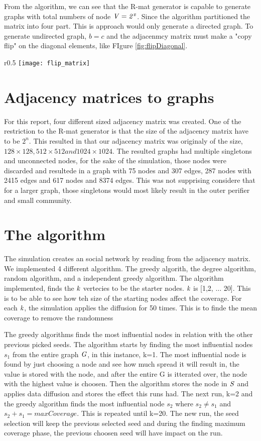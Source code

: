 From the algorithm, we can see that the R-mat generator is capable to generate graphs with total numbers of node $ \it{V} = 2^x$. Since the algorithm partitioned the matrix into four part. This is approach would only generate a directed graph. To generate undirected graph, $b = c$ and the adjacenmcy matrix must make a "copy flip" on the diagonal elements, like FIgure \ref{fig:flipDiagonal}. 

\begin{wrapfigure}{r}{0.5\textwidth}
\texttt{[image: flip\_matrix]}
\caption{How the adacency matrix is fliped on the diagonal}
\label{fig:flipDiagonal}
\end{wrapfigure}


\section{Adjacency matrices to graphs}
For this report, four different sized adjacency matrix was created. One of the restriction to the R-mat generator is that the size of the adjacency matrix have to be $2^n$. This resulted in that our adjacency matrix was originaly of the size, $128 \times 128, 512 \times 512 and 1024 \times 1024$. The resulted graphs had multiple singletons and unconnected nodes, for the sake of the simulation, those nodes were discarded and resultede in a graph with 75 nodes and 307 edges, 287 nodes with 2415 edges and 617 nodes and 8374 edges. This was not supprising considere that for a larger graph, those singletons would most likely result in the outer perifier and small community.

\section{The algorithm}
The simulation creates an social network by reading from the adjacency matrix. We implemented 4 different algorithm. The greedy algorith, the degree algorithm, random algorithm, and a independent greedy algorithm. The algorithm implemented, finds the $\it{k}$ vertecies to be the starter nodes. $\it{k}$ is [1,2,  $\dots$ 20]. This is to be able to see how teh size of the starting nodes affect the coverage. For each $\it{k}$, the simulation applies the diffusion for 50 times. This is to finde the mean coverage to remove the randomness 

The greedy algorithms finds the most influential nodes in relation with the other previous picked seeds. The algorithm starts by finding the most influential nodes $s_1$ from the entire graph $\it{G}$, in this instance, k=1. The most influential node is found by just choosing a node and see how much spread it will result in, the value is stored with the node, and after the entire G is itterated over, the node with the highest value is choosen. Then the algorithm stores the node in $\it{S}$ and applies data diffusion and stores the effect this runs had. The next run, k=2 and the greedy algorithm finds the most influential node $s_2$ where $s_2 \neq s_1$ and $s_2 +s_1 = maxCoverage$. This is repeated until k=20. The new run, the seed selection will keep the previous selected seed and during the finding maximum coverage phase, the previous choosen seed will have impact on the run.

